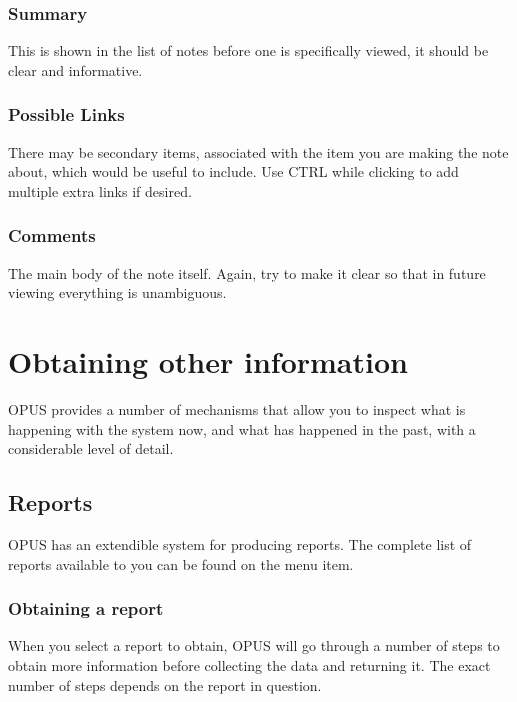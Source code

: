 \documentclass[12 pt]{book}
\begin{document}
\subsection{Summary}

This is shown in the list of notes before one is specifically viewed, it should
be clear and informative.

\subsection{Possible Links}

There may be secondary items, associated with the item you are making the note
about, which would be useful to include. Use CTRL while clicking to add
multiple extra links if desired.

\subsection{Comments}

The main body of the note itself. Again, try to make it clear so that in 
future viewing everything is unambiguous.



%
%
%

\chapter{Obtaining other information}

OPUS provides a number of mechanisms that allow you to inspect what is
happening with the system now, and what has happened in the past, with a
considerable level of detail.

\section{Reports}

OPUS has an extendible system for producing reports. The complete list of
reports available to you can be found on the 
 menu item.

\subsection{Obtaining a report}

When you select a report to obtain, OPUS will go through a number of steps to
obtain more information before collecting the data and returning it. The exact
number of steps depends on the report in question.
\end{document}
